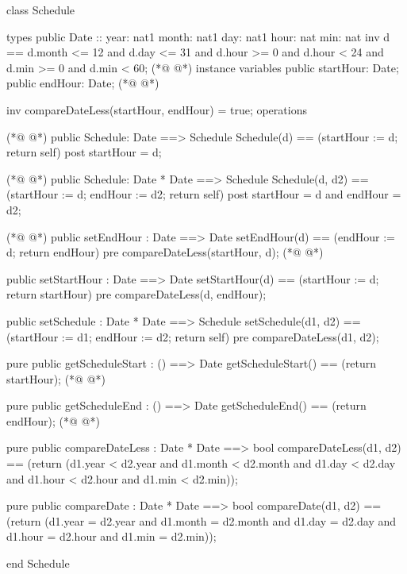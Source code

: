 \begin{vdmpp}[breaklines=true]
class Schedule

types
 public Date ::  year: nat1
         month: nat1
         day: nat1
         hour: nat
         min: nat
 inv d == d.month <= 12 and d.day <= 31 and d.hour >= 0 and d.hour < 24 and d.min >= 0 and d.min < 60;
(*@
\label{Schedule:10}
@*)
instance variables
  public startHour: Date;
  public endHour: Date;
(*@
\label{setEndHour:13}
@*)
  
  inv compareDateLess(startHour, endHour) = true;
operations

(*@
\label{setStartHour:17}
@*)
 public Schedule: Date ==> Schedule
  Schedule(d) == (startHour := d; return self)
 post startHour = d;
 
(*@
\label{setSchedule:21}
@*)
 public Schedule: Date * Date ==> Schedule
  Schedule(d, d2) == (startHour := d; endHour := d2; return self)
 post startHour = d and endHour = d2;
 
(*@
\label{getScheduleStart:25}
@*)
 public setEndHour : Date ==> Date
  setEndHour(d) == (endHour := d; return endHour)
 pre compareDateLess(startHour, d);
(*@
\label{getScheduleEnd:28}
@*)
  
 public setStartHour : Date ==> Date
  setStartHour(d) == (startHour := d; return startHour)
 pre compareDateLess(d, endHour);
 
 public setSchedule : Date * Date ==> Schedule
  setSchedule(d1, d2) == (startHour := d1; endHour := d2; return self)
 pre compareDateLess(d1, d2);
  
 pure public getScheduleStart : () ==> Date
  getScheduleStart() == (return startHour);
(*@
\label{compareDateLess:39}
@*)
  
 pure public getScheduleEnd : () ==> Date
  getScheduleEnd() == (return endHour);
(*@
\label{compareDate:42}
@*)
  
 pure public compareDateLess : Date * Date ==> bool
  compareDateLess(d1, d2) == (return (d1.year < d2.year and d1.month < d2.month and d1.day < d2.day and d1.hour < d2.hour and d1.min < d2.min));
  
 pure public compareDate : Date * Date ==> bool
  compareDate(d1, d2) == (return (d1.year = d2.year and d1.month = d2.month and d1.day = d2.day and d1.hour = d2.hour and d1.min = d2.min));

end Schedule
\end{vdmpp}
